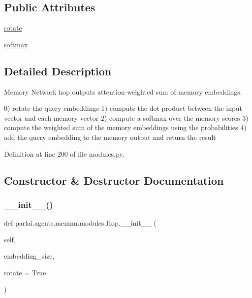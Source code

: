 \subsection*{Public Attributes}
\begin{DoxyCompactItemize}
\item 
\hyperlink{classparlai_1_1agents_1_1memnn_1_1modules_1_1Hop_a88857c10815bc48ef24c78ecf367935d}{rotate}
\item 
\hyperlink{classparlai_1_1agents_1_1memnn_1_1modules_1_1Hop_a50d4a5a4bd188efc2944d68c0761cc0a}{softmax}
\end{DoxyCompactItemize}


\subsection{Detailed Description}
\begin{DoxyVerb}Memory Network hop outputs attention-weighted sum of memory embeddings.

0) rotate the query embeddings 1) compute the dot product between the input vector
and each memory vector 2) compute a softmax over the memory scores 3) compute the
weighted sum of the memory embeddings using the probabilities 4) add the query
embedding to the memory output and return the result
\end{DoxyVerb}
 

Definition at line 200 of file modules.\+py.



\subsection{Constructor \& Destructor Documentation}
\mbox{\label{classparlai_1_1agents_1_1memnn_1_1modules_1_1Hop_aa38fc63425e2968ae2530edd6b37ad1a}} 
\subsubsection{\texorpdfstring{\+\_\+\+\_\+init\+\_\+\+\_\+()}{\_\_init\_\_()}}
{\footnotesize\ttfamily def parlai.\+agents.\+memnn.\+modules.\+Hop.\+\_\+\+\_\+init\+\_\+\+\_\+ (\begin{DoxyParamCaption}\item[{}]{self,  }\item[{}]{embedding\+\_\+size,  }\item[{}]{rotate = {\ttfamily True} }\end{DoxyParamCaption})}

